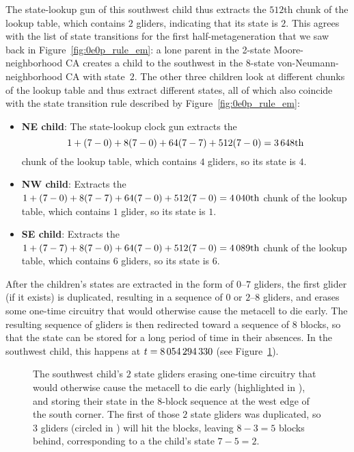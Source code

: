 The state-lookup gun of this southwest child thus extracts the $512$th chunk of the lookup table, which contains $2$ gliders, indicating that its state is $2$. This agrees with the list of state transitions for the first half-metageneration that we saw back in Figure~\ref{fig:0e0p_rule_em}: a lone parent in the 2-state Moore-neighborhood CA creates a child to the southwest in the 8-state von-Neumann-neighborhood CA with state~$2$. The other three children look at different chunks of the lookup table and thus extract different states, all of which also coincide with the state transition rule described by Figure~\ref{fig:0e0p_rule_em}:\smallskip

\begin{itemize}
	\item \textbf{NE child}: The state-lookup clock gun extracts the
	\[
		1 + (7-0) + 8(7-0) + 64(7-7) + 512(7-0) = 3{\,}648\text{th}
	\]
	chunk of the lookup table, which contains $4$ gliders, so its state is $4$.\smallskip
	
	\item \textbf{NW child}: Extracts the $1 + (7-0) + 8(7-7) + 64(7-0) + 512(7-0) = 4{\,}040\text{th}$ chunk of the lookup table, which contains $1$ glider, so its state is $1$.\smallskip
	
	\item \textbf{SE child}: Extracts the $1 + (7-7) + 8(7-0) + 64(7-0) + 512(7-0) = 4{\,}089\text{th}$ chunk of the lookup table, which contains $6$ gliders, so its state is $6$.\smallskip
\end{itemize}

After the children's states are extracted in the form of $0$--$7$ gliders, the first glider (if it exists) is duplicated, resulting in a sequence of $0$ or $2$--$8$ gliders, and erases some one-time circuitry that would otherwise cause the metacell to die early. The resulting sequence of gliders is then redirected toward a sequence of $8$ blocks, so that the state can be stored for a long period of time in their absences. In the southwest child, this happens at $t = 8{\,}054{\,}294{\,}330$ (see Figure~\ref{fig:0e0p_timeline_8054294330}).

\begin{figure}[!htb]
	\centering
	\caption{The southwest child's $2$ state gliders erasing one-time circuitry that would otherwise cause the metacell to die early (highlighted in ), and storing their state in the $8$-block sequence at the west edge of the south corner. The first of those $2$ state gliders was duplicated, so $3$ gliders (circled in ) will hit the blocks, leaving $8-3 = 5$ blocks behind, corresponding to a the child's state $7 - 5 = 2$.}
	\label{fig:0e0p_timeline_8054294330}
\end{figure}


